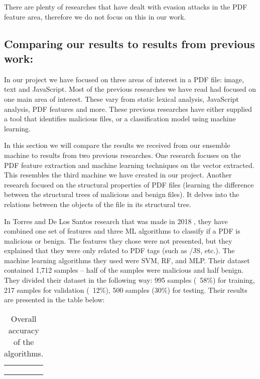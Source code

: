 \documentclass{article}
\begin{document}
\indent There are plenty of researches that have dealt with evasion attacks in the PDF feature area, therefore we do not focus on this in our work.

\subsection{Comparing our results to results from previous work:}
\indent In our project we have focused on three areas of interest in a PDF file: image, text and JavaScript. Most of the previous researches we have read had focused on one main area of interest. These vary from static lexical analysis, JavaScript analysis, PDF features and more. These previous researches have either supplied a tool that identifies malicious files, or a classification model using machine learning. 

\indent In this section we will compare the results we received from our ensemble machine to results from two previous researches. One research focuses on the PDF feature extraction and machine learning techniques on the vector extracted. This resembles the third machine we have created in our project. Another research focused on the structural properties of PDF files (learning the difference between the structural trees of malicious and benign files). It delves into the relations between the objects of the file in its structural tree. 

\indent In Torres and De Los Santos research that was made in 2018 \cite{torres2018malicious}, they have combined one set of features and three ML algorithms to classify if a PDF is malicious or benign. The features they chose were not presented, but they explained that they were only related to PDF tags (such as /JS,  etc.). The machine learning algorithms they used were SVM, RF, and MLP. Their dataset contained 1,712 samples – half of the samples were malicious and half benign. They divided their dataset in the following way: 995 samples (~58\%) for training, 217 samples for validation (~12\%), 500 samples (30\%) for testing. Their results are presented in the table below:

\begin{table}[htb]
\centering
\begin{tabular}{|l|l|}
	\hline
	\centering{\textbf{Algorithm}} & \centering{\textbf{Accuracy}}\tabularnewline
	\hline
	\centering{\textbf{SVM}} & \centering{50\%}\tabularnewline
	\hline
	\centering{\textbf{RF}} & \centering{92\%}\tabularnewline
	\hline
	\centering{\textbf{MLP}} & \centering{96\%}\tabularnewline
	\hline
\end{tabular}
\caption{Overall accuracy of the algorithms.}
\end{table}
\end{document}
